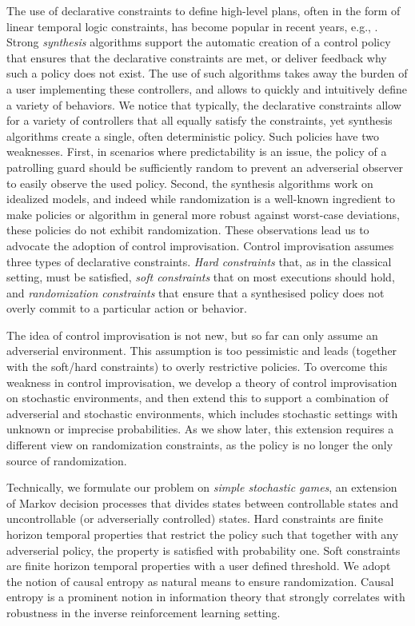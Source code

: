 The use of declarative constraints to define high-level plans, often in the form of linear temporal logic constraints, has become popular in recent years, e.g., \cite{DBLP:conf/iros/HorowitzWM14,DBLP:conf/rss/WongEK14,DBLP:conf/iros/HeLKV17,DBLP:conf/icra/FuATP16,DBLP:conf/icra/HeWKV19,DBLP:journals/arobots/MoarrefK20,DBLP:conf/icra/KantarosM0P20}. 
Strong \emph{synthesis} algorithms support the automatic creation of a control policy that ensures that the declarative constraints are met, or deliver feedback why such a policy does not exist. 
The use of such algorithms takes away the burden of a user implementing these controllers, and allows to quickly and intuitively define a variety of behaviors.
We notice that typically, the declarative constraints allow for a variety of controllers that all equally satisfy the constraints, yet synthesis algorithms create a single, often deterministic policy. 
Such policies have two weaknesses. First, in scenarios where predictability is an issue, the policy of a patrolling guard should be sufficiently random to prevent an adverserial observer to easily observe the used policy. 
Second, the synthesis algorithms work on idealized models, and indeed  while randomization is a well-known ingredient to make policies or algorithm in general more robust against worst-case deviations, these policies do not exhibit randomization.  
These observations lead us to advocate the adoption of control improvisation. 
Control improvisation assumes three types of declarative constraints. \emph{Hard constraints} that, as in the classical setting, must be satisfied, \emph{soft constraints} that on most executions should hold,
and \emph{randomization constraints} that ensure that a synthesised policy does not overly commit to a particular action or behavior. 

The idea of control improvisation is not new, but so far can only assume an adverserial environment. This assumption is too pessimistic and leads (together with the soft/hard constraints) to overly restrictive policies. 
To overcome this weakness in control improvisation, we develop a theory of control improvisation on stochastic environments, and then extend this to support a combination of adverserial and stochastic environments, which includes stochastic settings with unknown or imprecise probabilities.
As we show later, this extension requires a different view on randomization constraints, as the policy is no longer the only source of randomization. 


Technically, we formulate our problem on \emph{simple stochastic games}, an extension of Markov decision processes that divides states between controllable states and uncontrollable (or adverserially controlled) states. Hard constraints are finite horizon temporal properties that restrict the policy such that together with any adverserial policy, the property is satisfied with probability one. Soft constraints are finite horizon temporal properties with a user defined threshold. 
We adopt the notion of causal entropy as natural means to ensure randomization. Causal entropy is a prominent notion in information theory that strongly correlates with robustness in the inverse reinforcement learning setting. 

